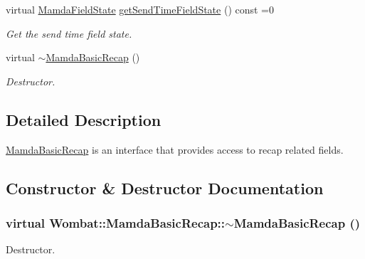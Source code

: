 \begin{CompactItemize}
virtual \hyperlink{namespaceWombat_93aac974f2ab713554fd12a1fa3b7d2a}{Mamda\-Field\-State} \hyperlink{classWombat_1_1MamdaBasicRecap_ff1be82223cb7fcfdbc80c4f1e43a849}{get\-Send\-Time\-Field\-State} () const =0
\begin{CompactList}\small\item\em Get the send time field state. \item\end{CompactList}\item 
virtual \hyperlink{classWombat_1_1MamdaBasicRecap_6c25b719e5659c878c9a2ec4e489c998}{$\sim$Mamda\-Basic\-Recap} ()
\begin{CompactList}\small\item\em Destructor. \item\end{CompactList}\end{CompactItemize}


\subsection{Detailed Description}
\hyperlink{classWombat_1_1MamdaBasicRecap}{Mamda\-Basic\-Recap} is an interface that provides access to recap related fields. 



\subsection{Constructor \& Destructor Documentation}
\hypertarget{classWombat_1_1MamdaBasicRecap_6c25b719e5659c878c9a2ec4e489c998}{
\subsubsection[$\sim$MamdaBasicRecap]{\setlength{\rightskip}{0pt plus 5cm}virtual Wombat::Mamda\-Basic\-Recap::$\sim$Mamda\-Basic\-Recap ()}}
\label{classWombat_1_1MamdaBasicRecap_6c25b719e5659c878c9a2ec4e489c998}


Destructor. 



